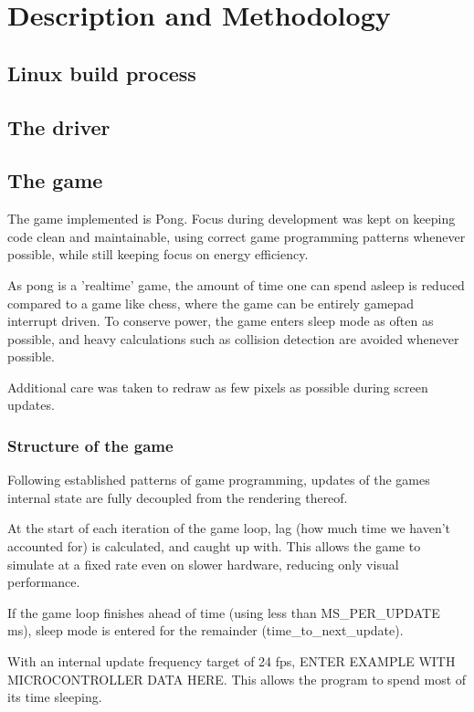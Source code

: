 \section{Description and Methodology}

\subsection{Linux build process}

\subsection{The driver}

\subsection{The game}

The game implemented is Pong. Focus during development was kept on keeping code
clean and maintainable, using correct game programming patterns whenever
possible, while still keeping focus on energy efficiency.

As pong is a 'realtime' game, the amount of time one can spend asleep is
reduced compared to a game like chess, where the game can be entirely gamepad
interrupt driven.  To conserve power, the game enters sleep mode as often as
possible, and heavy calculations such as collision detection are avoided
whenever possible.

Additional care was taken to redraw as few pixels as possible during screen
updates.

\subsubsection{Structure of the game}

Following established patterns of game programming, updates of the games
internal state are fully decoupled from the rendering thereof.

At the start of each iteration of the game loop, lag (how much time we haven't
accounted for) is calculated, and caught up with.  This allows the game to
simulate at a fixed rate even on slower hardware, reducing only visual
performance.

If the game loop finishes ahead of time (using less than MS\_PER\_UPDATE ms),
sleep mode is entered for the remainder (time\_to\_next\_update).

With an internal update frequency target of 24 fps,
ENTER EXAMPLE WITH MICROCONTROLLER DATA HERE.
This allows the program to spend most of its time sleeping.

